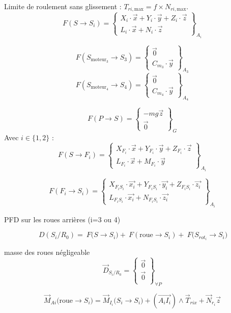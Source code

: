 \documentclass[a4paper,12pt]{report}  %
\begin{document}
Limite de roulement sans glissement : $T_{ri,\text{max}} = f \times N_{ri, \text{max}}$. 
$$
F(S \to S_i) = 
\begin{Bmatrix}
	X_i \cdot \vec{x} + Y_i \cdot \vec{y} + Z_i \cdot \vec{z} \\
	L_i \cdot \vec{x} + N_i \cdot \vec{z}
\end{Bmatrix}_{A_{i}}
$$


$$
F(S_{\text{moteur}_3}\to S_3) = 
\begin{Bmatrix}
	\vec{0} \\
	C_{m_3} \cdot \vec{y} 
\end{Bmatrix}_{A_{3}}
$$
$$
F(S_{\text{moteur}_4}\to S_4) = 
\begin{Bmatrix}
	\vec{0} \\
	C_{m_4} \cdot \vec{y} 
\end{Bmatrix}_{A_{4}}
$$



$$
F(P \to S) = 
\begin{Bmatrix}
	-mg\vec{z} \\
	\vec0 
\end{Bmatrix}_{G}
$$
Avec $i \in \{1,2\}$ : 
$$
F(S \to F_i) = 
\begin{Bmatrix}
	X_{F_i} \cdot \vec{x} + Y_{F_i} \cdot \vec{y} + Z_{F_i} \cdot \vec{z} \\
	L_{F_i} \cdot \vec{x} + M_{F_i} \cdot \vec{y}
\end{Bmatrix}_{A_{i}}
$$

$$
F(F_i \to S_i) = 
\begin{Bmatrix}
	X_{F_i S_i} \cdot \vec{x_i} + Y_{F_i S_i} \cdot \vec{y_i} + Z_{F_i S_i} \cdot \vec{z_i} \\
	L_{F_i S_i} \cdot \vec{x_i} + N_{F_i S_i} \cdot \vec{z_i}
\end{Bmatrix}_{A_{i}}
$$



PFD sur les roues arrières (i=3 ou 4)

$$\ {D}({S_i/R_0}) = \ {F}({S \rightarrow S_i)} + \ {F}{(\text{roue} \rightarrow S_i)} + \ {F} ({S_{rot_i}\rightarrow S_i)}$$

masse des roues négligeable $$\vec{D}_{S_i/R_0} = \begin{Bmatrix}
	\vec{0} \\
	\vec{0}\\ \end{Bmatrix}_{\forall P}$$


$$
\vec{M}_{Ai}({\text{roue} \rightarrow S_i)} = \vec{M}_{I_i}({S_i \rightarrow S_i)} + \left( \overrightarrow{A_iI_i} \right) \wedge \vec{T}_{rix} + \vec{N}_{r_i} \vec{z}
$$
\end{document}
